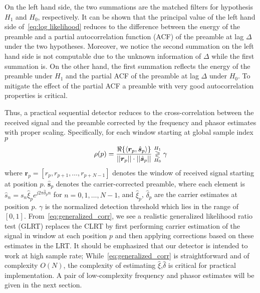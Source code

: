 On the left hand side, the two summations are the matched filters for hypothesis $H_1$
and $H_0$, respectively. 
It can be shown that the principal value of the left hand side of~\eqref{eq:log likelihood}
reduces to the difference between the energy of the preamble and a partial
autocorrelation function (ACF) of the preamble at lag $\Delta$ under
the two hypotheses.
Moreover, we notice the second summation on the left hand side is not computable
due to the unknown information of $\Delta$ while the first summation is.
On the other hand,
the first summation reflects the energy of the preamble
under $H_1$ and the partial ACF of the preamble at lag $\Delta$ under $H_0$.
To mitigate the effect of the partial ACF a preamble
with very good autocorrelation properties is critical.

Thus, a practical sequential detector reduces to the
cross-correlation between the received signal
and the preamble corrected by the frequency and phasor estimates with
proper scaling.
Specifically, for each window starting at global sample index $p$
\begin{equation}
  \label{eq:generalized_corr}
  \rho(p)=
  \frac{\Re\{\langle
    \bm{r}_{p},\hat{\bm{s}}_{p}\rangle\}}
  {||\bm{r}_{p}||\cdot||\hat{\bm{s}}_{p}||} \mathrel{\mathop\gtrless\limits^{H_1}_{H_0}} \gamma
\end{equation}
where $\bm{r}_{p}{=}[r_{p},r_{p+1},\ldots,r_{p+N-1}]$ denotes the window of received signal
starting at position $p$. $\hat{\bm{s}}_{p}$ denotes the carrier-corrected preamble,
where each element is $\hat{s}_{n}=s_n\hat{\xi}_{p}e^{j2\pi\hat{\delta}_{p}n}$
for $n=0,1,\ldots,N{-}1$, and $\hat{\xi}_{p}$, $\hat{\delta}_{p}$ are the carrier estimates at
position $p$.
$\gamma$ is the normalized detection threshold which lies in the range of $[0,1]$. 
From~\eqref{eq:generalized_corr}, we see
a realistic generalized likelihood ratio test (GLRT) replaces the CLRT
by first performing  carrier estimation of the signal in window at
each position $p$
and then applying corrections based on these estimates in the LRT.\@
It should be emphasized that our detector is intended to work at high sample rate;
While~\eqref{eq:generalized_corr} is straightforward and of complexity 
$O(N)$, the complexity of estimating $\hat{\xi}$,$\hat{\delta}$
is critical for practical implementation.  
A pair of low-complexity frequency and phasor estimates will be given in the next section.



